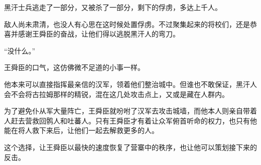 黑汗士兵逃走了一部分，又被杀了一部分，剩下的俘虏，多达上千人。

敌人尚未肃清，也没人有心思在这时候处置俘虏。不过聚集起来的将校们，还是恭喜并感谢王舜臣的奋战，让他们得以逃脱黑汗人的弯刀。

“没什么。”

王舜臣的口气，这仿佛微不足道的小事一样。

他本来可以直接指挥最亲信的汉军，领着他们整治城中。但谁也不敢保证，黑汗人会不会将古拉姆那样的精锐，混在这几处攻击点上，又或是藏在人群内。

为了避免仆从军大量阵亡，王舜臣就吩咐了汉军去攻击城墙，而他本人则亲自带着人赶去营救回鹘人和吐蕃人。只有王舜臣才有着让众军俯首听命的权力，也只有他能在将人救下来后，让他们一起去解救更多的人。

这个选择，让王舜臣以最快的速度恢复了营寨中的秩序，也让他可以策划接下来的反击。
